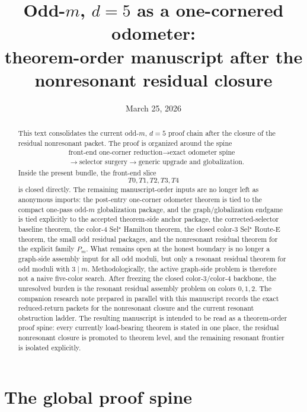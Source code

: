 \documentclass[11pt]{article}
\title{Odd-$m$, $d=5$ as a one-cornered odometer:\\
theorem-order manuscript after the nonresonant residual closure}
\author{}
\date{March 25, 2026}
\begin{document}
\maketitle


\begin{abstract}
This text consolidates the current odd-$m$, $d=5$ proof chain after the
closure of the residual nonresonant packet.
The proof is organized around the spine
\[
\begin{aligned}
&\text{front-end one-corner reduction}
\to
\text{exact odometer spine}\\
&\to
\text{selector surgery}
\to
\text{generic upgrade and globalization}.
\end{aligned}
\]
Inside the present bundle, the front-end slice
\[
T0,T1,T2,T3,T4
\]
is closed directly.
The remaining manuscript-order inputs are no longer left as anonymous imports:
the post-entry one-corner odometer theorem is tied to the compact one-pass
odd-$m$ globalization package, and the graph/globalization endgame is tied
explicitly to the accepted theorem-side anchor package, the corrected-selector
baseline theorem, the color-$4$ Sel$^{\star}$ Hamilton theorem, the closed
color-$3$ Sel$^{\star}$ Route-E theorem, the small odd residual packages, and
the nonresonant residual theorem for the explicit family $P_m$.
What remains open at the honest boundary is no longer a graph-side assembly
input for all odd moduli, but only a resonant residual theorem for odd moduli
with $3\mid m$.
Methodologically, the active graph-side problem is therefore not a naive
five-color search.
After freezing the closed color-$3$/color-$4$ backbone, the unresolved burden
is the resonant residual assembly problem on colors $0,1,2$.
The companion research note prepared in parallel with this manuscript records
the exact reduced-return packets for the nonresonant closure and the current
resonant obstruction ladder.
The resulting manuscript is intended to be read as a theorem-order proof spine:
every currently load-bearing theorem is stated in one place, the residual
nonresonant closure is promoted to theorem level, and the remaining resonant
frontier is isolated explicitly.
\end{abstract}

\tableofcontents

\section{The global proof spine}
\end{document}
